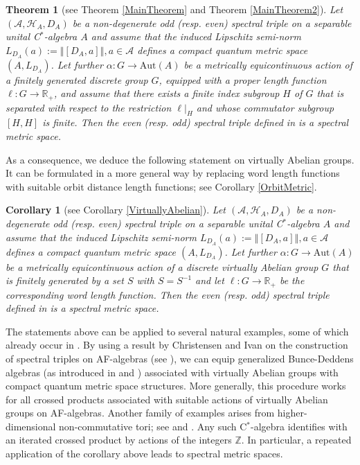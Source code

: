 \documentclass[a4paper,11pt,reqno]{amsart}
\numberwithin{equation}{section}
\numberwithin{equation}{section}
\newtheorem*{theorem*}{Theorem}
\newtheorem*{corollary*}{Corollary}
\theoremstyle{definition}
\theoremstyle{remark}
\theoremstyle{remark}
\begin{document}
\begin{theorem*}[see Theorem \ref{MainTheorem} and Theorem \ref{MainTheorem2}]
Let $(\mathcal{A},\mathcal{H}_{A},D_{A})$ be a non-degenerate odd
(resp. even) spectral triple on a separable unital C$^{\ast}$-algebra
$A$ and assume that the induced Lipschitz semi-norm $L_{D_{A}}(a):=\left\Vert [D_{A},a]\right\Vert ,a\in\mathcal{A}$
defines a compact quantum metric space $(A,L_{D_{A}})$. Let further
$\alpha:G\rightarrow\text{Aut}(A)$ be a metrically equicontinuous
action of a finitely generated discrete group $G$, equipped with
a proper length function $\ell:G\rightarrow\mathbb{R}_{+}$, and assume
that there exists a finite index subgroup $H$ of $G$ that is separated
with respect to the restriction $\ell|_{H}$ and whose commutator
subgroup $[H,H]$ is finite. Then the even (resp. odd) spectral triple
defined in \cite{HSWZ13} is a spectral metric space. \end{theorem*}

As a consequence, we deduce the following statement on virtually Abelian
groups. It can be formulated in a more general way by replacing word
length functions with suitable orbit distance length functions; see Corollary
\ref{OrbitMetric}.

\begin{corollary*}[see Corollary \ref{VirtuallyAbelian}]
Let $(\mathcal{A},\mathcal{H}_{A},D_{A})$ be a non-degenerate odd
(resp. even) spectral triple on a separable unital C$^{\ast}$-algebra
$A$ and assume that the induced Lipschitz semi-norm $L_{D_{A}}(a):=\left\Vert [D_{A},a]\right\Vert ,a\in\mathcal{A}$
defines a compact quantum metric space $(A,L_{D_{A}})$. Let further
$\alpha:G\rightarrow\text{Aut}(A)$ be a metrically equicontinuous
action of a discrete virtually Abelian group $G$ that is finitely generated by a set $S$ with $S=S^{-1}$ and let $\ell:G\rightarrow\mathbb{R}_{+}$ be the corresponding
word length function. Then the even (resp. odd) spectral triple defined
in \cite{HSWZ13} is a spectral metric space. \end{corollary*}

The statements above can be applied to several natural examples,
some of which already occur in \cite{HSWZ13}. By using a result by
Christensen and Ivan on the construction of spectral triples on AF-algebras
(see \cite{CI06}), we can equip generalized Bunce-Deddens algebras
(as introduced in \cite{Orfanos10} and \cite{Carrion11}) associated with virtually Abelian groups
with compact quantum metric space structures. More generally, this
procedure works for all crossed products associated with suitable
actions of virtually Abelian groups on AF-algebras. Another family
of examples arises from higher-dimensional non-commutative tori; see \cite{Rieffel81} and
\cite{Rieffel90}. Any such C$^{\ast}$-algebra identifies with an iterated
crossed product by actions of the integers $\mathbb{Z}$. In particular, a
repeated application of the corollary above leads to spectral metric spaces. \\
\end{document}
